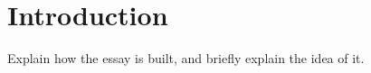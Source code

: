 \section{Introduction}
Explain how the essay is built, and briefly explain the idea of it.
\newpage
